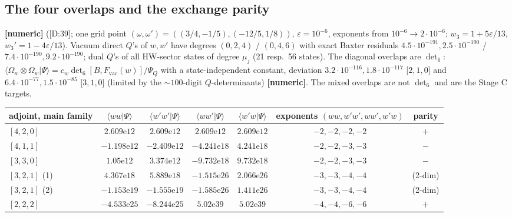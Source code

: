 \documentclass[10pt]{article}
\newcommand{\cl}[2]{\textsf{[#1:#2]}}
\newcommand{\tg}[1]{\textbf{[#1]}}
\newcommand{\Om}{\Omega}
\newcommand{\vac}{\mathrm{vac}}
\begin{document}
\subsection{The four overlaps and the exchange parity}\label{sec:Dfour}

\tg{numeric} (\cl{D}{39}; one grid point $(\omega,\omega')=((3/4,-1/5),(-12/5,1/8))$, $\varepsilon=10^{-6}$, exponents from $10^{-6}\to2\cdot10^{-6}$; $w_3=1+5\varepsilon/13$, $w_3'=1-4\varepsilon/13$). Vacuum direct $Q$'s of $w,w'$ have degrees $(0,2,4)$ / $(0,4,6)$ with exact Baxter residuals $4.5\cdot10^{-191},2.5\cdot10^{-190}$ / $7.4\cdot10^{-190},9.2\cdot10^{-190}$; dual $Q$'s of all HW-sector states of degree $\mu_j$ (21 resp.\ 56 states). The diagonal overlaps are $\det_6$: $\langle\Om_w\otimes\Om_w|\Psi\rangle=c_w\det_6[B,F_\vac(w)]/\Psi_Q$ with a state-independent constant, deviation $3.2\cdot10^{-116},1.8\cdot10^{-117}$ [$2,1,0$] and $6.4\cdot10^{-77},1.5\cdot10^{-85}$ [$3,1,0$] (limited by the $\sim100$-digit $Q$-determinants) \tg{numeric}. The mixed overlaps are not $\det_6$ and are the Stage C targets.
\begin{center}\footnotesize\setlength{\tabcolsep}{3pt}\begin{tabular}{@{}lcccccc@{}}\toprule
adjoint, main family & $\langle ww|\Psi\rangle$ & $\langle w'w'|\Psi\rangle$ & $\langle ww'|\Psi\rangle$ & $\langle w'w|\Psi\rangle$ & exponents $(ww,w'w',ww',w'w)$ & parity \\\midrule
$[4,2,0]$ & $2.609\mathrm{e}12$ & $2.609\mathrm{e}12$ & $2.609\mathrm{e}12$ & $2.609\mathrm{e}12$ & $-2,-2,-2,-2$ & $+$ \\
$[4,1,1]$ & $-1.198\mathrm{e}12$ & $-2.409\mathrm{e}12$ & $-4.241\mathrm{e}18$ & $4.241\mathrm{e}18$ & $-2,-2,-3,-3$ & $-$ \\
$[3,3,0]$ & $1.05\mathrm{e}12$ & $3.374\mathrm{e}12$ & $-9.732\mathrm{e}18$ & $9.732\mathrm{e}18$ & $-2,-2,-3,-3$ & $-$ \\
$[3,2,1]$ (1) & $4.367\mathrm{e}18$ & $5.889\mathrm{e}18$ & $-1.515\mathrm{e}26$ & $2.066\mathrm{e}26$ & $-3,-3,-4,-4$ & (2-dim) \\
$[3,2,1]$ (2) & $-1.153\mathrm{e}19$ & $-1.555\mathrm{e}19$ & $-1.585\mathrm{e}26$ & $1.411\mathrm{e}26$ & $-3,-3,-4,-4$ & (2-dim) \\
$[2,2,2]$ & $-4.533\mathrm{e}25$ & $-8.244\mathrm{e}25$ & $5.02\mathrm{e}39$ & $5.02\mathrm{e}39$ & $-4,-4,-6,-6$ & $+$ \\\bottomrule
\end{tabular}\end{center}
\end{document}
